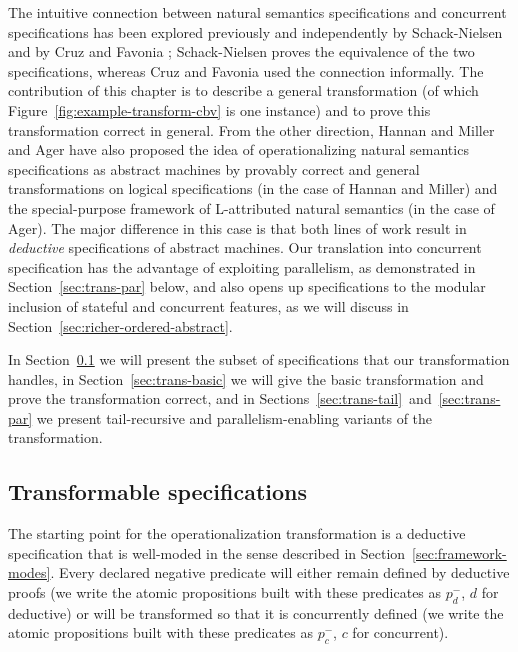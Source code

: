 The intuitive connection between natural semantics specifications and
concurrent specifications has been explored previously and
independently by Schack-Nielsen \cite{schacknielsen07induction} and by
Cruz and Favonia \cite{cruz12parallel}; Schack-Nielsen proves the
equivalence of the two specifications, whereas Cruz and Favonia used
the connection informally. The contribution of this chapter is to
describe a general transformation (of which
Figure~\ref{fig:example-transform-cbv} is one instance) and to prove
this transformation correct in general. From the other direction,
Hannan and Miller \cite{hannan92operational} and Ager
\cite{ager04natural} have also proposed the idea of operationalizing
natural semantics specifications as abstract machines by provably
correct and general transformations on logical specifications (in the
case of Hannan and Miller) and the special-purpose framework of
L-attributed natural semantics (in the case of Ager). The major
difference in this case is that both lines of work result in {\it
  deductive} specifications of abstract machines. Our translation into
concurrent specification has the advantage of exploiting parallelism,
as demonstrated in Section~\ref{sec:trans-par} below, and also opens
up specifications to the modular inclusion of stateful and concurrent
features, as we will discuss in
Section~\ref{sec:richer-ordered-abstract}.

In Section~\ref{sec:trans-subset} we will present the subset of
specifications that our transformation handles, in
Section~\ref{sec:trans-basic} we will give the basic transformation
and prove the transformation correct, and in
Sections~\ref{sec:trans-tail}~and~\ref{sec:trans-par} we present
tail-recursive and parallelism-enabling variants of the transformation.

\subsection{Transformable specifications}
\label{sec:trans-subset}

The starting point for the operationalization transformation is a
deductive specification that is well-moded in the sense described in
Section~\ref{sec:framework-modes}. Every declared negative predicate
will either remain defined by deductive proofs (we write the atomic
propositions built with these predicates as $p_d^-$, $d$ for
deductive) or will be transformed so that it is concurrently defined
(we write the atomic propositions built with these predicates as
$p_c^-$, $c$ for concurrent).

